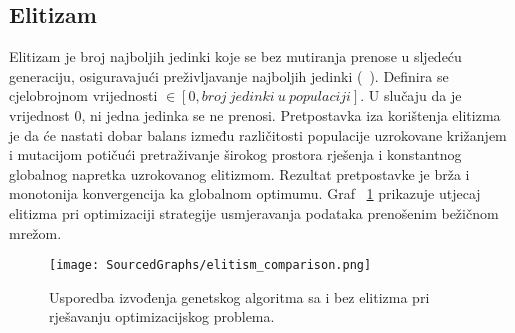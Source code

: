 \subsection{Elitizam}
Elitizam je broj najboljih jedinki koje se bez mutiranja prenose u sljedeću generaciju, osiguravajući preživljavanje najboljih jedinki (~\cite{elitism}).
Definira se cjelobrojnom vrijednosti $\in [0, broj\ jedinki\ u\ populaciji]$.
U slučaju da je vrijednost 0, ni jedna jedinka se ne prenosi.
Pretpostavka iza korištenja elitizma je da će nastati dobar balans između različitosti populacije uzrokovane križanjem i mutacijom potičući pretraživanje širokog prostora rješenja i konstantnog globalnog napretka uzrokovanog elitizmom.
Rezultat pretpostavke je brža i monotonija konvergencija ka globalnom optimumu.
Graf ~\ref{fig:elitism} prikazuje utjecaj elitizma pri optimizaciji strategije usmjeravanja podataka prenošenim bežičnom mrežom.

\begin{figure}
	\centering
	\texttt{[image: SourcedGraphs/elitism\_comparison.png]}
	\caption{Usporedba izvođenja genetskog algoritma sa i bez elitizma pri rješavanju optimizacijskog problema.}
	\label{fig:elitism}
\end{figure}


